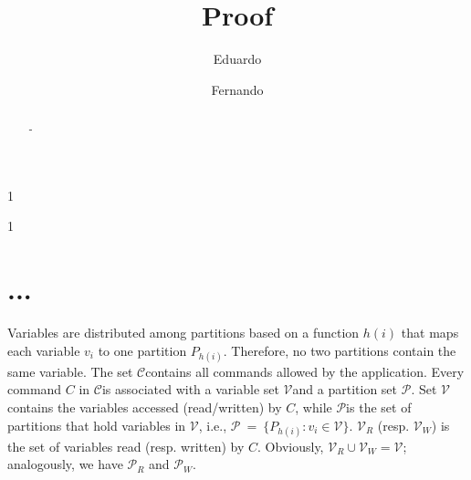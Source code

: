 \documentclass{usiinftr}
\begin{document}
%
%
\title{Proof}

%
%
\author{Eduardo}{1}
\author{Fernando}{1}

%
%

%
%

\newcommand{\ex}{$\mathcal{E}$}
\newcommand{\pp}{$\mathcal{P}$}
\newcommand{\ppm}{\mathcal{P}}
\newcommand{\cc}{$\mathcal{C}$}
\newcommand{\ccm}{\mathcal{C}}
\newcommand{\vv}{$\mathcal{V}$}
\newcommand{\vvm}{\mathcal{V}}
\newcommand{\ts}{\text{\textit{ts}}}
\newcommand{\sendersTo}{\text{\textit{sendersTo}}}

%
%

%
%


\maketitle

\begin{abstract}
-
\end{abstract}

\section{...}

Variables are distributed among partitions based on a function $h(i)$ that maps each variable $v_i$ to one partition $P_{h(i)}$. Therefore, no two partitions contain the same variable. The set \cc contains all commands allowed by the application. Every command $C$ in \cc is associated with a variable set \vv and a partition set \pp. Set \vv contains the variables accessed (read/written) by $C$, while \pp is the set of partitions that hold variables in \vv, i.e., $\ppm~=~\{P_{h(i)} : v_i \in \vvm\}$.
$\vvm_R$ (resp. $\vvm_W$) is the set of variables read (resp. written) by $C$. Obviously, $\vvm_R \cup \vvm_W = \vvm$; analogously, we have $\ppm_R$ and $\ppm_W$.
\end{document}
